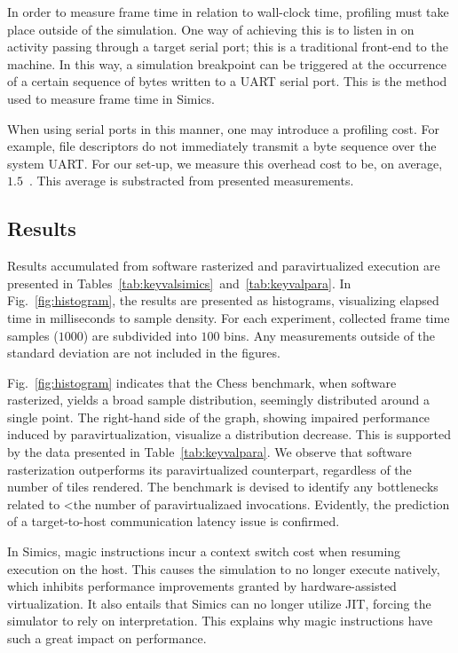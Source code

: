 In order to measure frame time in relation to wall-clock time, profiling must take place outside of the simulation.
One way of achieving this is to listen in on activity passing through a target serial port; this is a traditional front-end to the machine.
In this way, a simulation breakpoint can be triggered at the occurrence of a certain sequence of bytes written to a UART serial port.
This is the method used to measure frame time in Simics.

When using serial ports in this manner, one may introduce a profiling cost.
For example, file descriptors do not immediately transmit a byte sequence over the system UART.
For our set-up, we measure this overhead cost to be, on average, $1.5$~\milli\second .
This average is substracted from presented measurements.

\subsection{Results}
\label{sec:results}
Results accumulated from software rasterized and paravirtualized execution are presented in Tables~\ref{tab:keyvalsimics}~and~\ref{tab:keyvalpara}.
In Fig.~\ref{fig:histogram}, the results are presented as histograms, visualizing elapsed time in milliseconds to sample density.
For each experiment, collected frame time samples ($1000$) are subdivided into $100$ bins.
Any measurements outside of the standard deviation are not included in the figures.

Fig.~\ref{fig:histogram} indicates that the Chess benchmark, when software rasterized, yields a broad sample distribution, seemingly distributed around a single point.
The right-hand side of the graph, showing impaired performance induced by paravirtualization, visualize a distribution decrease.
This is supported by the data presented in Table~\ref{tab:keyvalpara}.
We observe that software rasterization outperforms its paravirtualized counterpart, regardless of the number of tiles rendered.
The benchmark is devised to identify any bottlenecks related to <the number of paravirtualizaed invocations.
Evidently, the prediction of a target-to-host communication latency issue is confirmed.

In Simics, magic instructions incur a context switch cost when resuming execution on the host.
This causes the simulation to no longer execute natively, which inhibits performance improvements granted by hardware-assisted virtualization.
It also entails that Simics can no longer utilize JIT, forcing the simulator to rely on interpretation.
This explains why magic instructions have such a great impact on performance.

